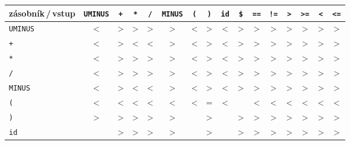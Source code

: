 \begin{tabular}{|l|c|c|c|c|c|c|c|c|c|c|c|c|c|c|c|}
\hline
\rowcolor[HTML]{B2B2B2}
zásobník\,/\,vstup & \texttt{UMINUS} & \texttt{+} & \texttt{*} & \texttt{/} & \texttt{MINUS} & \texttt{(} & \texttt{)} & \texttt{id} & \texttt{\$} & \texttt{==} & \texttt{!=} & \texttt{>} & \texttt{>=} & \texttt{<} & \texttt{<=} \\ \hline
\texttt{UMINUS} & \textless{} & \textgreater{} & \textgreater{} & \textgreater{} & \textgreater{} & \textless{} & \textgreater{} & \textless{} & \textgreater{} & \textgreater{} & \textgreater{} & \textgreater{} & \textgreater{} & \textgreater{} & \textgreater{} \\ \hline
\rowcolor[HTML]{EEEEEE}
\texttt{+} & \textless{} & \textgreater{} & \textless{} & \textless{} & \textgreater{} & \textless{} & \textgreater{} & \textless{} & \textgreater{} & \textgreater{} & \textgreater{} & \textgreater{} & \textgreater{} & \textgreater{} & \textgreater{} \\ \hline
\texttt{*} & \textless{} & \textgreater{} & \textgreater{} & \textgreater{} & \textgreater{} & \textless{} & \textgreater{} & \textless{} & \textgreater{} & \textgreater{} & \textgreater{} & \textgreater{} & \textgreater{} & \textgreater{} & \textgreater{} \\ \hline
\rowcolor[HTML]{EEEEEE}
\texttt{/} & \textless{} & \textgreater{} & \textgreater{} & \textgreater{} & \textgreater{} & \textless{} & \textgreater{} & \textless{} & \textgreater{} & \textgreater{} & \textgreater{} & \textgreater{} & \textgreater{} & \textgreater{} & \textgreater{} \\ \hline
\texttt{MINUS} & \textless{} & \textgreater{} & \textless{} & \textless{} & \textgreater{} & \textless{} & \textgreater{} & \textless{} & \textgreater{} & \textgreater{} & \textgreater{} & \textgreater{} & \textgreater{} & \textgreater{} & \textgreater{} \\ \hline
\rowcolor[HTML]{EEEEEE}
\texttt{(} & \textless{} & \textless{} & \textless{} & \textless{} & \textless{} & \textless{} & = & \textless{} & & \textless{} & \textless{} & \textless{} & \textless{} & \textless{} & \textless{} \\ \hline
\texttt{)} & \textgreater{} & \textgreater{} & \textgreater{} & \textgreater{} & \textgreater{} & & \textgreater{} & & \textgreater{} & \textgreater{} & \textgreater{} & \textgreater{} & \textgreater{} & \textgreater{} & \textgreater{} \\ \hline
\rowcolor[HTML]{EEEEEE}
\texttt{id} & & \textgreater{} & \textgreater{} & \textgreater{} & \textgreater{} & & \textgreater{} & & \textgreater{} & \textgreater{} & \textgreater{} & \textgreater{} & \textgreater{} & \textgreater{} & \textgreater{} \\ \hline

\end{tabular}
